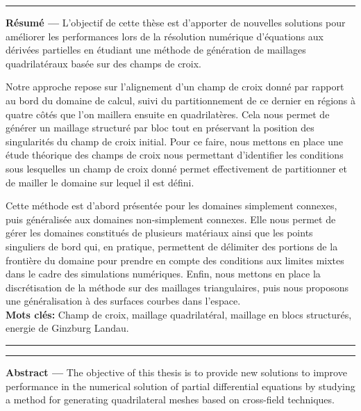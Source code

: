  
\begin{vcenterpage}

\noindent\rule[2pt]{\textwidth}{0.5pt}

{\textbf{Résumé ---}}
L'objectif de cette thèse est d'apporter de nouvelles solutions pour améliorer les performances lors de la résolution numérique d'équations aux dérivées partielles en étudiant une méthode de génération de maillages quadrilatéraux basée sur des champs de croix.

Notre approche repose sur l'alignement d'un champ de croix donné par rapport au bord du domaine de calcul, suivi du partitionnement de ce dernier en régions à quatre côtés que l'on maillera ensuite en quadrilatères. Cela nous permet de générer un maillage structuré par bloc tout en préservant la position des singularités du champ de croix initial. Pour ce faire, nous mettons en place une étude théorique des champs de croix nous permettant d'identifier les conditions sous lesquelles un champ de croix donné permet effectivement de partitionner et de mailler le domaine sur lequel il est défini.

Cette méthode est d'abord présentée pour les domaines simplement connexes, puis généralisée aux domaines non-simplement connexes. Elle nous permet de gérer les domaines constitués de plusieurs matériaux ainsi que les points singuliers de bord qui, en pratique, permettent de délimiter des portions de la frontière du domaine pour prendre en compte des conditions aux limites mixtes dans le cadre des simulations numériques. Enfin, nous mettons en place la discrétisation de la méthode sur des maillages triangulaires, puis nous proposons une généralisation à des surfaces courbes dans l'espace.\\

{\textbf{Mots clés:}}
    Champ de croix, maillage quadrilatéral, maillage en blocs structurés, energie de Ginzburg Landau.
\\
\noindent\rule[2pt]{\textwidth}{0.5pt}

\vspace{0.5cm}

\noindent\rule[2pt]{\textwidth}{0.5pt}
{\textbf{Abstract ---}}
The objective of this thesis is to provide new solutions to improve performance in the numerical solution of partial differential equations by studying a method for generating quadrilateral meshes based on cross-field techniques.


\end{vcenterpage}
